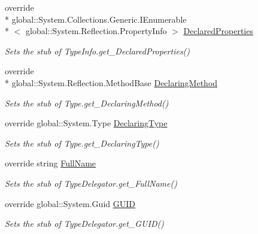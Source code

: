 \begin{DoxyCompactItemize}
override \\*
global\-::\-System.\-Collections.\-Generic.\-I\-Enumerable\\*
$<$ global\-::\-System.\-Reflection.\-Property\-Info $>$ \hyperlink{class_system_1_1_reflection_1_1_fakes_1_1_stub_type_delegator_ada2adf36be47da8067347cb79dc6aa72}{Declared\-Properties}
\begin{DoxyCompactList}\small\item\em Sets the stub of Type\-Info.\-get\-\_\-\-Declared\-Properties()\end{DoxyCompactList}\item 
override \\*
global\-::\-System.\-Reflection.\-Method\-Base \hyperlink{class_system_1_1_reflection_1_1_fakes_1_1_stub_type_delegator_aa2b6db107b3629df46ec058a53b98125}{Declaring\-Method}
\begin{DoxyCompactList}\small\item\em Sets the stub of Type.\-get\-\_\-\-Declaring\-Method()\end{DoxyCompactList}\item 
override global\-::\-System.\-Type \hyperlink{class_system_1_1_reflection_1_1_fakes_1_1_stub_type_delegator_aecf6e7db9dc3a8d05a6120051b3c62de}{Declaring\-Type}
\begin{DoxyCompactList}\small\item\em Sets the stub of Type.\-get\-\_\-\-Declaring\-Type()\end{DoxyCompactList}\item 
override string \hyperlink{class_system_1_1_reflection_1_1_fakes_1_1_stub_type_delegator_aaaefae5e8833a6a67119195506703159}{Full\-Name}
\begin{DoxyCompactList}\small\item\em Sets the stub of Type\-Delegator.\-get\-\_\-\-Full\-Name()\end{DoxyCompactList}\item 
override global\-::\-System.\-Guid \hyperlink{class_system_1_1_reflection_1_1_fakes_1_1_stub_type_delegator_ab94c07cb97693a1980b5ee96e26f8f13}{G\-U\-I\-D}
\begin{DoxyCompactList}\small\item\em Sets the stub of Type\-Delegator.\-get\-\_\-\-G\-U\-I\-D()\end{DoxyCompactList}\item 

\end{DoxyCompactItemize}
